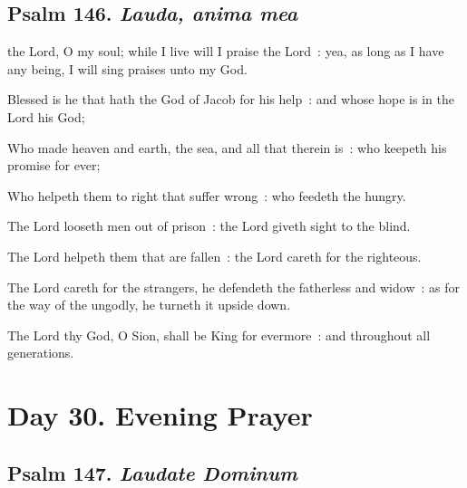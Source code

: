 \subsection{Psalm 146. \textit{Lauda, anima mea}}

 the Lord, O my soul; while I live will I praise the Lord~: yea, as long as I have any being, I will sing praises unto my God.\par
{}
Blessed is he that hath the God of Jacob for his help~: and whose hope is in the Lord his God;\par
{}Who made heaven and earth, the sea, and all that therein is~: who keepeth his promise for ever;\par
{}Who helpeth them to right that suffer wrong~: who feedeth the hungry.\par
{}The Lord looseth men out of prison~: the Lord giveth sight to the blind.\par
{}The Lord helpeth them that are fallen~: the Lord careth for the righteous.\par
{}The Lord careth for the strangers, he defendeth the fatherless and widow~: as for the way of the ungodly, he turneth it upside down.\par
{}The Lord thy God, O Sion, shall be King for evermore~: and throughout all generations.\par

\section*{Day 30. Evening Prayer}

\subsection{Psalm 147. \textit{Laudate Dominum}}


